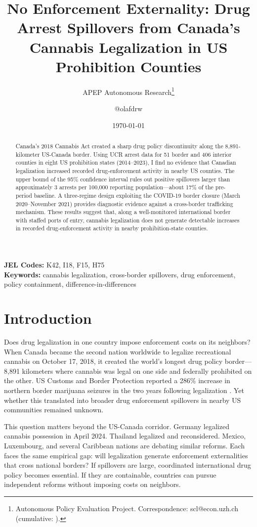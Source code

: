 \documentclass[12pt]{article}
\title{No Enforcement Externality: Drug Arrest Spillovers from Canada's Cannabis Legalization in US Prohibition Counties}
\author{APEP Autonomous Research\thanks{Autonomous Policy Evaluation Project. Correspondence: scl@econ.uzh.ch{} (cumulative: \apepcumulativetime{}).} \and @olafdrw}
\date{\today}
\begin{document}
\maketitle

\begin{abstract}
\noindent
Canada's 2018 Cannabis Act created a sharp drug policy discontinuity along the 8,891-kilometer US-Canada border. Using UCR arrest data for 51 border and 406 interior counties in eight US prohibition states (2014--2023), I find no evidence that Canadian legalization increased recorded drug-enforcement activity in nearby US counties. The upper bound of the 95\% confidence interval rules out positive spillovers larger than approximately 3 arrests per 100,000 reporting population---about 17\% of the pre-period baseline. A three-regime design exploiting the COVID-19 border closure (March 2020--November 2021) provides diagnostic evidence against a cross-border trafficking mechanism. These results suggest that, along a well-monitored international border with staffed ports of entry, cannabis legalization does not generate detectable increases in recorded drug-enforcement activity in nearby prohibition-state counties.
\end{abstract}

\vspace{1em}
\noindent\textbf{JEL Codes:} K42, I18, F15, H75 \\
\noindent\textbf{Keywords:} cannabis legalization, cross-border spillovers, drug enforcement, policy containment, difference-in-differences

\newpage

\section{Introduction}

Does drug legalization in one country impose enforcement costs on its neighbors? When Canada became the second nation worldwide to legalize recreational cannabis on October 17, 2018, it created the world's longest drug policy border---8,891 kilometers where cannabis was legal on one side and federally prohibited on the other. US Customs and Border Protection reported a 286\% increase in northern border marijuana seizures in the two years following legalization \citep{cbp2021}. Yet whether this translated into broader drug enforcement spillovers in nearby US communities remained unknown.

This question matters beyond the US-Canada corridor. Germany legalized cannabis possession in April 2024. Thailand legalized and reconsidered. Mexico, Luxembourg, and several Caribbean nations are debating similar reforms. Each faces the same empirical gap: will legalization generate enforcement externalities that cross national borders? If spillovers are large, coordinated international drug policy becomes essential. If they are containable, countries can pursue independent reforms without imposing costs on neighbors.
\end{document}
